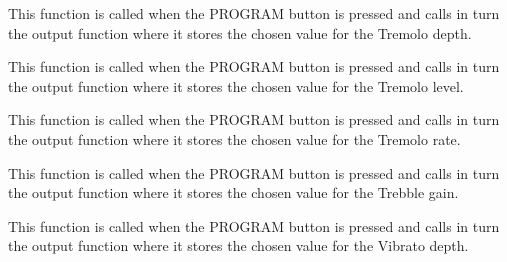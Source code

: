 \documentclass[letterpaper,10pt,english]{sphinxmanual}
\begin{document}

\begin{fulllineitems}
\label{Code:GUI.set_tremoloDepth}
This function is called when the PROGRAM button is pressed and calls in turn the output function where it stores the chosen 
value for the Tremolo depth.

\end{fulllineitems}


\begin{fulllineitems}
\label{Code:GUI.set_tremoloLevel}
This function is called when the PROGRAM button is pressed and calls in turn the output function where it stores the chosen 
value for the Tremolo level.

\end{fulllineitems}


\begin{fulllineitems}
\label{Code:GUI.set_tremoloRate}
This function is called when the PROGRAM button is pressed and calls in turn the output function where it stores the chosen 
value for the Tremolo rate.

\end{fulllineitems}


\begin{fulllineitems}
\label{Code:GUI.set_tv}
This function is called when the PROGRAM button is pressed and calls in turn the output function where it stores the chosen 
value for the Trebble gain.

\end{fulllineitems}


\begin{fulllineitems}
\label{Code:GUI.set_vibratoDepth}
This function is called when the PROGRAM button is pressed and calls in turn the output function where it stores the chosen 
value for the Vibrato depth.

\end{fulllineitems}
\end{document}
